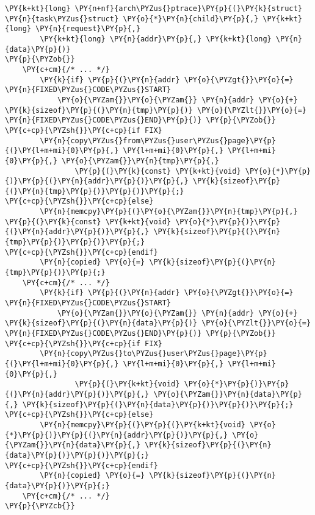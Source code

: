 \begin{Verbatim}[commandchars=\\\{\}]
\PY{k+kt}{long} \PY{n+nf}{arch\PYZus{}ptrace}\PY{p}{(}\PY{k}{struct} \PY{n}{task\PYZus{}struct} \PY{o}{*}\PY{n}{child}\PY{p}{,} \PY{k+kt}{long} \PY{n}{request}\PY{p}{,}
        \PY{k+kt}{long} \PY{n}{addr}\PY{p}{,} \PY{k+kt}{long} \PY{n}{data}\PY{p}{)}
\PY{p}{\PYZob{}}
    \PY{c+cm}{/* ... */}
        \PY{k}{if} \PY{p}{(}\PY{n}{addr} \PY{o}{\PYZgt{}}\PY{o}{=} \PY{n}{FIXED\PYZus{}CODE\PYZus{}START}
            \PY{o}{\PYZam{}}\PY{o}{\PYZam{}} \PY{n}{addr} \PY{o}{+} \PY{k}{sizeof}\PY{p}{(}\PY{n}{tmp}\PY{p}{)} \PY{o}{\PYZlt{}}\PY{o}{=} \PY{n}{FIXED\PYZus{}CODE\PYZus{}END}\PY{p}{)} \PY{p}{\PYZob{}}
\PY{c+cp}{\PYZsh{}}\PY{c+cp}{if FIX}
        \PY{n}{copy\PYZus{}from\PYZus{}user\PYZus{}page}\PY{p}{(}\PY{l+m+mi}{0}\PY{p}{,} \PY{l+m+mi}{0}\PY{p}{,} \PY{l+m+mi}{0}\PY{p}{,} \PY{o}{\PYZam{}}\PY{n}{tmp}\PY{p}{,}
                \PY{p}{(}\PY{k}{const} \PY{k+kt}{void} \PY{o}{*}\PY{p}{)}\PY{p}{(}\PY{n}{addr}\PY{p}{)}\PY{p}{,} \PY{k}{sizeof}\PY{p}{(}\PY{n}{tmp}\PY{p}{)}\PY{p}{)}\PY{p}{;}
\PY{c+cp}{\PYZsh{}}\PY{c+cp}{else}
        \PY{n}{memcpy}\PY{p}{(}\PY{o}{\PYZam{}}\PY{n}{tmp}\PY{p}{,} \PY{p}{(}\PY{k}{const} \PY{k+kt}{void} \PY{o}{*}\PY{p}{)}\PY{p}{(}\PY{n}{addr}\PY{p}{)}\PY{p}{,} \PY{k}{sizeof}\PY{p}{(}\PY{n}{tmp}\PY{p}{)}\PY{p}{)}\PY{p}{;}
\PY{c+cp}{\PYZsh{}}\PY{c+cp}{endif}
        \PY{n}{copied} \PY{o}{=} \PY{k}{sizeof}\PY{p}{(}\PY{n}{tmp}\PY{p}{)}\PY{p}{;}
    \PY{c+cm}{/* ... */}
        \PY{k}{if} \PY{p}{(}\PY{n}{addr} \PY{o}{\PYZgt{}}\PY{o}{=} \PY{n}{FIXED\PYZus{}CODE\PYZus{}START}
            \PY{o}{\PYZam{}}\PY{o}{\PYZam{}} \PY{n}{addr} \PY{o}{+} \PY{k}{sizeof}\PY{p}{(}\PY{n}{data}\PY{p}{)} \PY{o}{\PYZlt{}}\PY{o}{=} \PY{n}{FIXED\PYZus{}CODE\PYZus{}END}\PY{p}{)} \PY{p}{\PYZob{}}
\PY{c+cp}{\PYZsh{}}\PY{c+cp}{if FIX}
        \PY{n}{copy\PYZus{}to\PYZus{}user\PYZus{}page}\PY{p}{(}\PY{l+m+mi}{0}\PY{p}{,} \PY{l+m+mi}{0}\PY{p}{,} \PY{l+m+mi}{0}\PY{p}{,}
                \PY{p}{(}\PY{k+kt}{void} \PY{o}{*}\PY{p}{)}\PY{p}{(}\PY{n}{addr}\PY{p}{)}\PY{p}{,} \PY{o}{\PYZam{}}\PY{n}{data}\PY{p}{,} \PY{k}{sizeof}\PY{p}{(}\PY{n}{data}\PY{p}{)}\PY{p}{)}\PY{p}{;}
\PY{c+cp}{\PYZsh{}}\PY{c+cp}{else}
        \PY{n}{memcpy}\PY{p}{(}\PY{p}{(}\PY{k+kt}{void} \PY{o}{*}\PY{p}{)}\PY{p}{(}\PY{n}{addr}\PY{p}{)}\PY{p}{,} \PY{o}{\PYZam{}}\PY{n}{data}\PY{p}{,} \PY{k}{sizeof}\PY{p}{(}\PY{n}{data}\PY{p}{)}\PY{p}{)}\PY{p}{;}
\PY{c+cp}{\PYZsh{}}\PY{c+cp}{endif}
        \PY{n}{copied} \PY{o}{=} \PY{k}{sizeof}\PY{p}{(}\PY{n}{data}\PY{p}{)}\PY{p}{;}
    \PY{c+cm}{/* ... */}
\PY{p}{\PYZcb{}}
\end{Verbatim}
